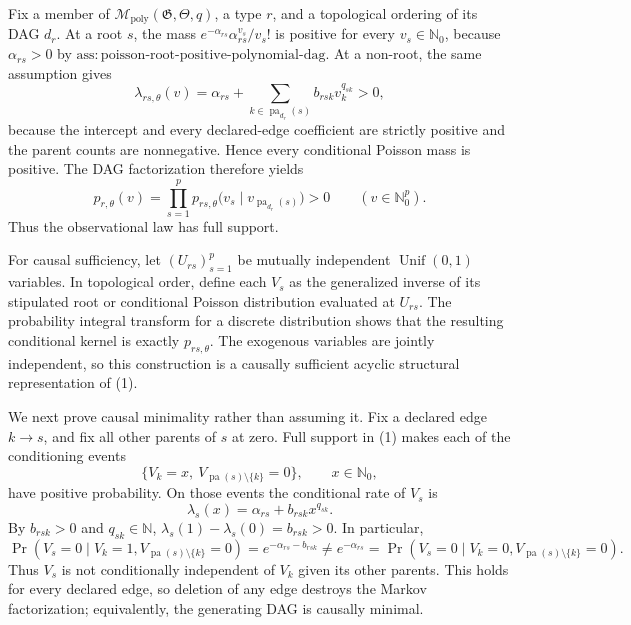 Fix a member of \(\mathcal M_{\mathrm{poly}}(\mathfrak G,\Theta,q)\), a type \(r\), and a topological ordering of its DAG \(d_r\).  At a root \(s\), the mass \(e^{-\alpha_{rs}}\alpha_{rs}^{v_s}/v_s!\) is positive for every \(v_s\in\mathbb N_0\), because \(\alpha_{rs}>0\) by \(\mathrm{ass{:}poisson\text{-}root\text{-}positive\text{-}polynomial\text{-}dag}\).  At a non-root, the same assumption gives
\[
\lambda_{rs,\theta}(v)=\alpha_{rs}+
\sum_{k\in\operatorname{pa}_{d_r}(s)}b_{rsk}v_k^{q_{sk}}>0,
\]
because the intercept and every declared-edge coefficient are strictly positive and the parent counts are nonnegative.  Hence every conditional Poisson mass is positive.  The DAG factorization therefore yields
\[
 p_{r,\theta}(v)=\prod_{s=1}^{p}
 p_{rs,\theta}\bigl(v_s\mid v_{\operatorname{pa}_{d_r}(s)}\bigr)>0
 \qquad(v\in\mathbb N_0^p). \tag{1}
\]
Thus the observational law has full support.

For causal sufficiency, let \((U_{rs})_{s=1}^p\) be mutually independent \(\operatorname{Unif}(0,1)\) variables.  In topological order, define each \(V_s\) as the generalized inverse of its stipulated root or conditional Poisson distribution evaluated at \(U_{rs}\).  The probability integral transform for a discrete distribution shows that the resulting conditional kernel is exactly \(p_{rs,\theta}\).  The exogenous variables are jointly independent, so this construction is a causally sufficient acyclic structural representation of (1).

We next prove causal minimality rather than assuming it.  Fix a declared edge \(k\to s\), and fix all other parents of \(s\) at zero.  Full support in (1) makes each of the conditioning events
\[
 \{V_k=x,\ V_{\operatorname{pa}(s)\setminus\{k\}}=0\},
 \qquad x\in\mathbb N_0,
\]
have positive probability.  On those events the conditional rate of \(V_s\) is
\[
 \lambda_s(x)=\alpha_{rs}+b_{rsk}x^{q_{sk}}. \tag{2}
\]
By \(b_{rsk}>0\) and \(q_{sk}\in\mathbb N\),
\(\lambda_s(1)-\lambda_s(0)=b_{rsk}>0\).  In particular,
\[
 \Pr(V_s=0\mid V_k=1,V_{\operatorname{pa}(s)\setminus\{k\}}=0)
 =e^{-\alpha_{rs}-b_{rsk}}
 \ne e^{-\alpha_{rs}}
 =\Pr(V_s=0\mid V_k=0,V_{\operatorname{pa}(s)\setminus\{k\}}=0). \tag{3}
\]
Thus \(V_s\) is not conditionally independent of \(V_k\) given its other parents.  This holds for every declared edge, so deletion of any edge destroys the Markov factorization; equivalently, the generating DAG is causally minimal.

